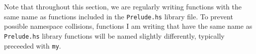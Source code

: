 \begin{remark*}
  Note that throughout this section, we are regularly writing functions with the same name as functions included in the \texttt{Prelude.hs} library file.
  To prevent possible namespace collisions, functions I am writing that have the same name as \texttt{Prelude.hs} library functions will be named slightly differently, typically preceeded with \texttt{my}.
\end{remark*}







